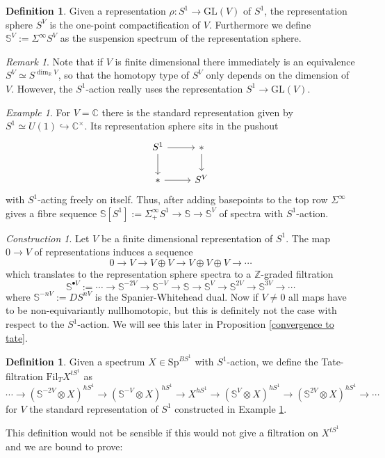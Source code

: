 \documentclass[10pt, reqno]{amsart}
\theoremstyle{definition}
\newtheorem{definition}[theorem]{Definition}
\theoremstyle{remark}
\newtheorem{remark}[theorem]{Remark}
\newtheorem{example}[theorem]{Example}
\newtheorem{construction}[theorem]{Construction}
\newcommand{\Z}{\mathbb{Z}}
\newcommand{\Cx}{\mathbb{C}}
\newcommand{\Sp}{\mathrm{Sp}}
\newcommand{\Fil}{\mathrm{Fil}}
\renewcommand{\S}{\mathbb{S}}
\newcommand{\GL}{\mathrm{GL}}
\newcommand{\R}{\mathbb{R}}
\begin{document}
\begin{definition}
	Given a representation $\rho\colon S^1\to\GL(V)$ of $S^1$, the representation sphere $S^V$ is the one-point compactification of $V$. Furthermore we define $\S^V:=\Sigma^\infty S^V$ as the suspension spectrum of the representation sphere.
\end{definition}

\begin{remark}
	Note that if $V$ is finite dimensional there immediately is an equivalence $S^V\simeq S^{\dim_\R V}$, so that the homotopy type of $S^V$ only depends on the dimension of $V$. However, the $S^1$-action really uses the representation $S^1\to \GL(V)$.
\end{remark}

\begin{example}\label{standard representation}
	For $V=\Cx$ there is the standard representation given by $S^1\simeq U(1)\hookrightarrow \Cx^\times$. Its representation sphere sits in the pushout
	\[\begin{tikzcd}
	S^1\ar[r]\ar[d]&*\ar[d]\\
	*\ar[r]&S^V
	\end{tikzcd}\]
	with $S^1$-acting freely on itself. Thus, after adding basepoints to the top row $\Sigma^\infty$ gives a fibre sequence $\S[S^1]:=\Sigma^\infty_+S^1\to \S\to \S^V$ of spectra with $S^1$-action.
\end{example}

\begin{construction}
	Let $V$ be a finite dimensional representation of $S^1$. The map $0\to V$ of representations induces a sequence
	\[0\to V\to V\oplus V\to V\oplus V\oplus V\to\cdots\]
	which translates to the representation sphere spectra to a $\Z$-graded filtration
	\begin{equation}\label{repfiltration}
	\S^{\bullet V}:=\cdots\to \S^{-2V}\to\S^{ -V}\to\S\to \S^{V}\to\S^{ 2V}\to\S^{ 3V}\to \cdots
	\end{equation}
	where $\S^{ -nV}:=DS^{ nV}$ is the Spanier-Whitehead dual.
	Now if $V\neq 0$ all maps have to be non-equivariantly nullhomotopic, but this is definitely not the case with respect to the $S^1$-action. We will see this later in Proposition \ref{convergence to tate}.
\end{construction}
\begin{definition}
	Given a spectrum $X\in\Sp^{BS^1}$ with $S^1$-action, we define the Tate-filtration $\Fil_T X^{tS^1}$ as
		\[\cdots {\to} \left(\S^{  -2V}{\otimes} X\right)^{hS^1} {\to}\left(\S^{  -V}{\otimes} X\right)^{hS^1} {\to} X^{hS^1} {\to} \left(\S^{V}\otimes X\right)^{hS^1} {\to}\left(\S^{  2V}{\otimes} X\right)^{hS^1} {\to} \cdots\]
	for $V$ the standard representation of $S^1$ constructed in Example \ref{standard representation}.
\end{definition}
This definition would not be sensible if this would not give a filtration on $X^{tS^1}$ and we are bound to prove:
\end{document}
